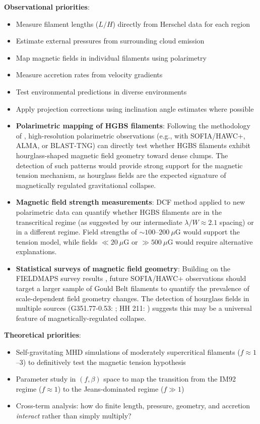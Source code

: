 \documentclass[11pt,a4paper]{article}
\begin{document}
\textbf{Observational priorities}:
\begin{itemize}
    \item Measure filament lengths ($L/H$) directly from Herschel data for each region
    \item Estimate external pressures from surrounding cloud emission
    \item Map magnetic fields in individual filaments using polarimetry
    \item Measure accretion rates from velocity gradients \citep{Chen2024}
    \item Test environmental predictions in diverse environments
    \item Apply projection corrections using inclination angle estimates where possible
    \item \textbf{Polarimetric mapping of HGBS filaments}: Following the methodology of \citet{Jadhav2026}, high-resolution polarimetric observations (e.g., with SOFIA/HAWC+, ALMA, or BLAST-TNG) can directly test whether HGBS filaments exhibit hourglass-shaped magnetic field geometry toward dense clumps. The detection of such patterns would provide strong support for the magnetic tension mechanism, as hourglass fields are the expected signature of magnetically regulated gravitational collapse.
    \item \textbf{Magnetic field strength measurements}: DCF method applied to new polarimetric data can quantify whether HGBS filaments are in the transcritical regime (as suggested by our intermediate $\lambda/W \approx 2.1$ spacing) or in a different regime. Field strengths of $\sim100$--$200~\mu$G would support the tension model, while fields $\ll 20~\mu$G or $\gg 500~\mu$G would require alternative explanations.
    \item \textbf{Statistical surveys of magnetic field geometry}: Building on the FIELDMAPS survey results \citep{Coude2025}, future SOFIA/HAWC+ observations should target a larger sample of Gould Belt filaments to quantify the prevalence of scale-dependent field geometry changes. The detection of hourglass fields in multiple sources (G351.77-0.53: \citet{Jadhav2026}; HH 211: \citet{Choi2025}) suggests this may be a universal feature of magnetically-regulated collapse.
\end{itemize}

\textbf{Theoretical priorities}:
\begin{itemize}
    \item Self-gravitating MHD simulations of moderately supercritical filaments ($f \approx 1$--$3$) to definitively test the magnetic tension hypothesis
    \item Parameter study in $(f, \beta)$ space to map the transition from the IM92 regime ($f \approx 1$) to the Jeans-dominated regime ($f \gg 1$)
    \item Cross-term analysis: how do finite length, pressure, geometry, and accretion \textit{interact} rather than simply multiply?
\end{itemize}
\end{document}
